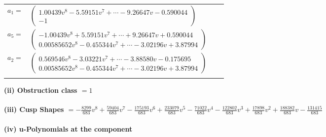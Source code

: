 \documentclass[1p]{elsarticle_modified}
\theoremstyle{definition}
\begin{document}
\begin{tabular}{m{7pt} m{180pt} m{7pt} m{180pt} }
\flushright $a_{1}=$&$\begin{pmatrix}1.00439 v^{8}-5.59151 v^{7}+\cdots-9.26647 v-0.590044\\-1\end{pmatrix}$ \\
\flushright $a_{5}=$&$\begin{pmatrix}-1.00439 v^{8}+5.59151 v^{7}+\cdots+9.26647 v+0.590044\\0.00585652 v^{8}-0.455344 v^{7}+\cdots-3.02196 v+3.87994\end{pmatrix}$ \\
\flushright $a_{2}=$&$\begin{pmatrix}0.569546 v^{8}-3.03221 v^{7}+\cdots-3.88580 v-0.175695\\0.00585652 v^{8}-0.455344 v^{7}+\cdots-3.02196 v+3.87994\end{pmatrix}$\\&\end{tabular}
\flushleft \textbf{(ii) Obstruction class $= 1$}\\~\\
\flushleft \textbf{(iii) Cusp Shapes $= -\frac{8299}{683} v^8+\frac{59404}{683} v^7-\frac{175193}{683} v^6+\frac{233079}{683} v^5-\frac{71022}{683} v^4-\frac{122802}{683} v^3+\frac{17898}{683} v^2+\frac{188382}{683} v-\frac{131415}{683}$}\\~\\
\newpage\renewcommand{\arraystretch}{1}
\flushleft \textbf{(iv) u-Polynomials at the component}\newline \\
\end{document}
